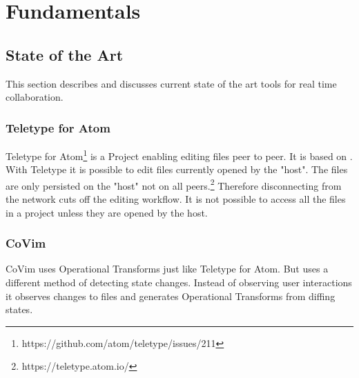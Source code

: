 \chapter{Fundamentals}
\label{sec:fundamentals}

\section{State of the Art}
\label{sec:stateoftheart}

This section describes and discusses current state of the art tools for real time collaboration.

\subsection{Teletype for Atom}
Teletype for Atom\footnote{https://github.com/atom/teletype/issues/211} is a Project enabling editing files peer to peer. It is based on 	\cite{Oster:2006:DataconsistencyforP2Pcollaborativeediting} \cite{YuWeihai:2014} \cite{BriotUrsoShapiro:2016:HighResponsivenessGroupEditing}.
With Teletype it is possible to edit files currently opened by the "host". The files are only persisted on the "host" not on all peers.\footnote{https://teletype.atom.io/}
Therefore disconnecting from the network cuts off the editing workflow. It is not possible to access all the files in a project unless they are opened by the host. 
\subsection{CoVim}
CoVim\cite{ChoNgSun:2017:CoVim:Incorporatingreal-timecollaborationcapabilitiesintocomprehensivetexteditors} uses Operational Transforms just like Teletype for Atom. But uses a different method of detecting state changes. Instead of observing user interactions it observes changes to files and generates Operational Transforms from diffing states.
